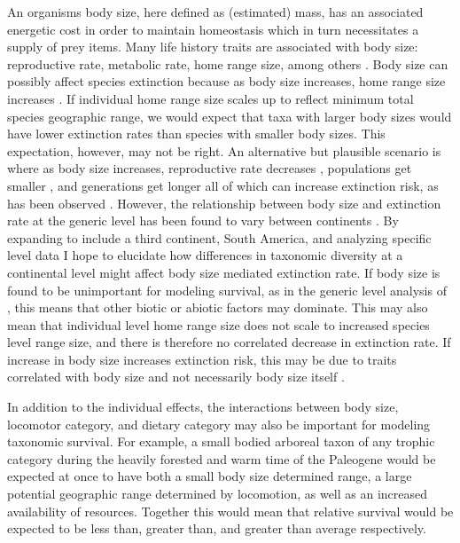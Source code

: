 \documentclass[11pt,letterpaper]{article}
\begin{document}
An organisms body size, here defined as (estimated) mass, has an associated energetic cost in order to maintain homeostasis which in turn necessitates a supply of prey items. Many life history traits are associated with body size: reproductive rate, metabolic rate, home range size, among others \cite{Peters1983a,Damuth1979,Brown1987,Smith2004}. Body size can possibly affect species extinction because as body size increases, home range size increases \citep{Damuth1979}. If individual home range size scales up to reflect minimum total species geographic range, we would expect that taxa with larger body sizes would have lower extinction rates than species with smaller body sizes. This expectation, however, may not be right. An alternative but plausible scenario is where as body size increases, reproductive rate decreases \citep{Johnson2002b}, populations get smaller \citep{White2007}, and generations get longer \citep{Martin1993a} all of which can increase extinction risk, as has been observed \citep{Liow2008,Davidson2012}. However, the relationship between body size and extinction rate at the generic level has been found to vary between continents \citep{Tomiya2013,Liow2008}. By expanding to include a third continent, South America, and analyzing specific level data I hope to elucidate how differences in taxonomic diversity at a continental level might affect body size mediated extinction rate. If body size is found to be unimportant for modeling survival, as in the generic level analysis of \citet{Tomiya2013}, this means that other biotic or abiotic factors may dominate. This may also mean that individual level home range size does not scale to increased species level range size, and there is therefore no correlated decrease in extinction rate. If increase in body size increases extinction risk, this may be due to traits correlated with body size and not necessarily body size itself \citep{Johnson2002b}.

In addition to the individual effects, the interactions between body size, locomotor category, and dietary category may also be important for modeling taxonomic survival. For example, a small bodied arboreal taxon of any trophic category during the heavily forested and warm time of the Paleogene would be expected at once to have both a small body size determined range, a large potential geographic range determined by locomotion, as well as an increased availability of resources. Together this would mean that relative survival would be expected to be less than, greater than, and greater than average respectively. 
\end{document}
